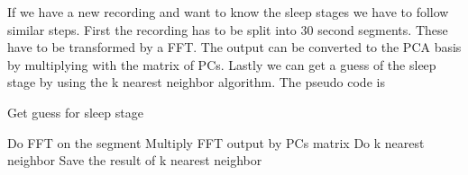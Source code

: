 If we have a new recording and want to know the sleep stages we have to follow similar steps. First the recording has to be split into 30 second segments. These have to be transformed by a FFT. The output can be converted to the PCA basis by multiplying with the matrix of PCs. Lastly we can get a guess of the sleep stage by using the k nearest neighbor algorithm. The pseudo code is

\begin{algorithm}
	\caption{Get guess for sleep stage}\label{alg:gues_sleep_stage}
	\begin{algorithmic}
			\State Do FFT on the segment
			\State Multiply FFT output by PCs matrix
			\State Do k nearest neighbor
			\State Save the result of k nearest neighbor
		\EndFor
	\end{algorithmic}
\end{algorithm}
